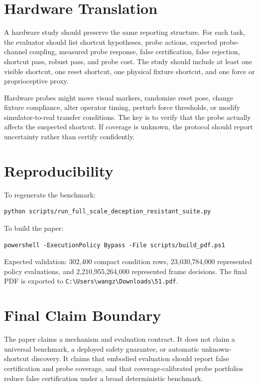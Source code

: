 \documentclass{article}
\begin{document}
\clearpage
\section{Hardware Translation}

A hardware study should preserve the same reporting structure. For each task, the evaluator should list shortcut hypotheses, probe actions, expected probe-channel coupling, measured probe response, false certification, false rejection, shortcut pass, robust pass, and probe cost. The study should include at least one visible shortcut, one reset shortcut, one physical fixture shortcut, and one force or proprioceptive proxy.

Hardware probes might move visual markers, randomize reset pose, change fixture compliance, alter operator timing, perturb force thresholds, or modify simulator-to-real transfer conditions. The key is to verify that the probe actually affects the suspected shortcut. If coverage is unknown, the protocol should report uncertainty rather than certify confidently.

\clearpage
\section{Reproducibility}

To regenerate the benchmark:
\begin{verbatim}
python scripts/run_full_scale_deception_resistant_suite.py
\end{verbatim}
To build the paper:
\begin{verbatim}
powershell -ExecutionPolicy Bypass -File scripts/build_pdf.ps1
\end{verbatim}
Expected validation: 302,400 compact condition rows, 23,030,784,000 represented policy evaluations, and 2,210,955,264,000 represented frame decisions. The final PDF is exported to \texttt{C:\textbackslash Users\textbackslash wangz\textbackslash Downloads\textbackslash 51.pdf}.

\clearpage
\section{Final Claim Boundary}

The paper claims a mechanism and evaluation contract. It does not claim a universal benchmark, a deployed safety guarantee, or automatic unknown-shortcut discovery. It claims that embodied evaluation should report false certification and probe coverage, and that coverage-calibrated probe portfolios reduce false certification under a broad deterministic benchmark.
\end{document}

